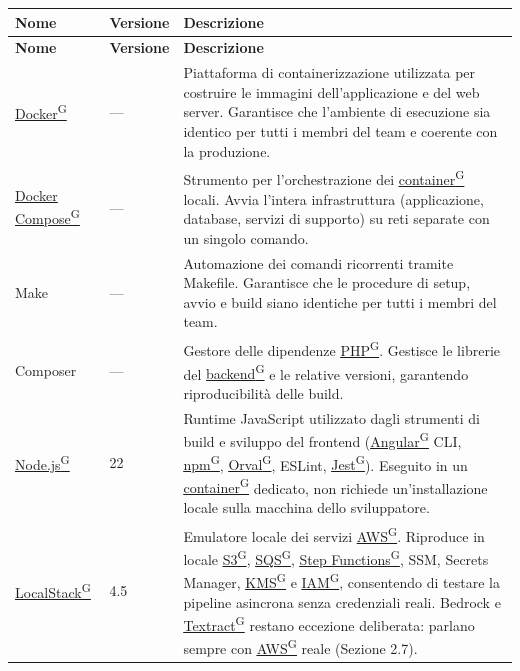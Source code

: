 \documentclass[a4paper,12pt]{article}
\providecommand{\glslink}[2]{\href{https://alittlebyte-19.github.io/Documentazione/glossario.html\#gls-#1}{\underline{#2}\textsuperscript{\scriptsize G}}}
\begin{document}
\renewcommand{\arraystretch}{1.3}
{\small
\setlength{\LTleft}{0pt}
\setlength{\LTright}{0pt}
\begin{longtable}{|p{3.5cm}|p{1.8cm}|p{9.2cm}|}
    \hline
    \rowcolor{gray!20}
    \textbf{Nome} & \textbf{Versione} & \textbf{Descrizione} \\
    \hline
    \endfirsthead
    \hline
    \rowcolor{gray!20}
    \textbf{Nome} & \textbf{Versione} & \textbf{Descrizione} \\
    \hline
    \endhead
    \glslink{docker}{Docker} & --- & Piattaforma di containerizzazione utilizzata per costruire le immagini dell'applicazione e del web server. Garantisce che l'ambiente di esecuzione sia identico per tutti i membri del team e coerente con la produzione. \\
    \hline
    \glslink{docker-compose}{Docker Compose} & --- & Strumento per l'orchestrazione dei \glslink{container}{container} locali. Avvia l'intera infrastruttura (applicazione, database, servizi di supporto) su reti separate con un singolo comando. \\
    \hline
    Make & --- & Automazione dei comandi ricorrenti tramite Makefile. Garantisce che le procedure di setup, avvio e build siano identiche per tutti i membri del team. \\
    \hline
    Composer & --- & Gestore delle dipendenze \glslink{php}{PHP}. Gestisce le librerie del \glslink{backend}{backend} e le relative versioni, garantendo riproducibilità delle build. \\
    \hline
    \glslink{node-js}{Node.js} & 22 & Runtime JavaScript utilizzato dagli strumenti di build e sviluppo del frontend (\glslink{angular}{Angular} CLI, \glslink{npm}{npm}, \glslink{orval}{Orval}, ESLint, \glslink{jest}{Jest}). Eseguito in un \glslink{container}{container} dedicato, non richiede un'installazione locale sulla macchina dello sviluppatore. \\
    \hline
    \glslink{localstack}{LocalStack} & 4.5 & Emulatore locale dei servizi \glslink{aws}{AWS}. Riproduce in locale \glslink{s3-simple-storage-service}{S3}, \glslink{sqs-simple-queue-service}{SQS}, \glslink{step-functions}{Step Functions}, SSM, Secrets Manager, \glslink{kms-key-management-service}{KMS} e \glslink{iam-identity-and-access-management}{IAM}, consentendo di testare la pipeline asincrona senza credenziali reali. Bedrock e \glslink{textract}{Textract} restano eccezione deliberata: parlano sempre con \glslink{aws}{AWS} reale (Sezione 2.7). \\

\end{longtable}}
\end{document}
